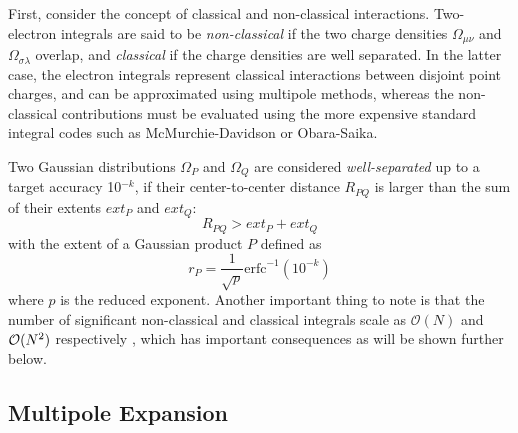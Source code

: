 First, consider the concept of classical and non-classical interactions. Two-electron integrals are said to be \emph{non-classical} if the two charge densities $\Omega_{\mu\nu}$ and $\Omega_{\sigma\lambda}$ overlap, and \emph{classical} if the charge densities are well separated. In the latter case, the electron integrals represent classical interactions between disjoint point charges, and can be approximated using multipole methods, whereas the non-classical contributions must be evaluated using the more expensive standard integral codes such as McMurchie-Davidson or Obara-Saika. 

Two Gaussian distributions $\Omega_P$ and $\Omega_Q$ are considered \emph{well-separated} up to a target accuracy 10$^{-k}$, if their center-to-center distance $R_{PQ}$ is larger than the sum of their extents $ext_P$ and $ext_Q$:
\begin{equation}
R_{PQ} > ext_P + ext_Q
\end{equation} 
\noindent with the extent of a Gaussian product $P$ defined as 
\begin{equation}
r_P = \frac{1}{\sqrt{p}} \mathrm{erfc}^{-1}(10^{-k})
\end{equation}
\noindent where $p$ is the reduced exponent. Another important thing to note is that the number of significant non-classical and classical integrals scale as $\mathcal{O}(N)$ and $\mathcal{O}(N^{2})$ respectively \cite{Hel2000}, which has important consequences as will be shown further below. 

\subsection{Multipole Expansion}

